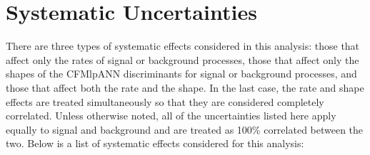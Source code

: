 \section{Systematic Uncertainties}
\label{systematics_overview}

\par There are three types of systematic effects considered in this
analysis: those that affect only the rates of signal or background
processes, those that affect only the shapes of the CFMlpANN
discriminants for signal or background processes, and those that
affect both the rate and the shape.  In the last case, the rate and
shape effects are treated simultaneously so that they are considered
completely correlated.  Unless otherwise noted, all of the
uncertainties listed here apply equally to signal and background and
are treated as 100\%  correlated between the two.  Below is a list of
systematic effects considered for this analysis:

